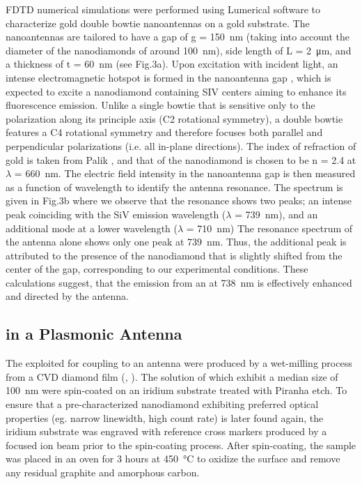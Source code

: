 	FDTD numerical simulations were performed using Lumerical software to characterize gold double bowtie nanoantennas on a gold substrate. The nanoantennas are tailored to have a gap of g = \SI{150}{nm} (taking into account the diameter of the nanodiamonds of around \SI{100}{nm}), side length of L = \SI{2}{\micro\meter}, and a thickness of t = \SI{60}{nm} (see Fig.3a). 
	Upon excitation with incident light, an intense electromagnetic hotspot is formed in the nanoantenna gap \cite{Rahbany2015}, which is expected to excite a nanodiamond containing SIV centers aiming to enhance its fluorescence emission. 
	Unlike a single bowtie that is sensitive only to the polarization along its principle axis (C2 rotational symmetry), a double bowtie features a C4 rotational symmetry and therefore focuses both parallel and perpendicular polarizations (i.e. all in-plane directions).
	The index of refraction of gold is taken from Palik \cite{}, and that of the nanodiamond is chosen to be n = 2.4 at $\lambda$ = \SI{660}{nm}. 
	The electric field intensity in the nanoantenna gap is then measured as a function of wavelength to identify the antenna resonance. 
	The spectrum is given in Fig.3b where we observe that the resonance shows two peaks; an intense peak coinciding with the SiV emission wavelength ($\lambda$ = \SI{739}{nm}), and an additional mode at a lower wavelength ($\lambda$ = \SI{710}{nm}) \cite{Rahbany2016}
	The resonance spectrum of the antenna alone shows only one peak at \SI{739}{nm}. 
	Thus, the additional peak is attributed to the presence of the nanodiamond that is slightly shifted from the center of the gap, corresponding to our experimental conditions.
	These calculations suggest, that the emission from an \siv at \SI{738}{nm} is effectively enhanced and directed by the antenna.

	\subsection{\siv in a Plasmonic Antenna}

	The \nds exploited for coupling to an antenna were produced by a wet-milling process from a CVD diamond film (\muzha, \williams).
	The solution of \nds which exhibit a median size of \SI{100}{nm} were spin-coated on an iridium substrate treated with Piranha etch. 
	To ensure that a pre-characterized nanodiamond exhibiting preferred optical properties (eg. narrow linewidth, high count rate) is later found again, the iridium substrate was engraved with reference cross markers produced by a focused ion beam prior to the spin-coating process.
	After spin-coating, the sample was placed in an oven for 3 hours at \SI{450}{\celsius} to oxidize the surface and remove any residual graphite and amorphous carbon. 

